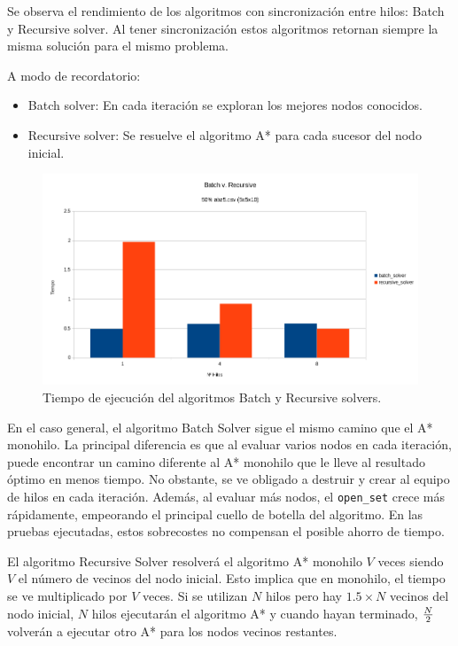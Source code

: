 Se observa el rendimiento de los algoritmos con sincronización entre hilos:
Batch y Recursive solver.
Al tener sincronización estos algoritmos retornan siempre la misma solución
para el mismo problema.

A modo de recordatorio:
\begin{itemize}[itemsep=0.25px]
    \item Batch solver: En cada iteración se exploran los mejores nodos conocidos.
    \item Recursive solver: Se resuelve el algoritmo A* para cada sucesor del nodo inicial.
\end{itemize}

\begin{figure}[h]
    \begin{center}
        \includegraphics[width=\textwidth]{Media/Ch2/Runtime_BatchRecursive.png}
    \end{center}
    \caption{Tiempo de ejecución del algoritmos Batch y Recursive solvers.}
    \label{fig:BatchRecursive}
\end{figure}

En el caso general, el algoritmo Batch Solver sigue el mismo camino que
el A* monohilo. La principal diferencia es que al evaluar varios nodos
en cada iteración, puede encontrar un camino diferente al A* monohilo
que le lleve al resultado óptimo en menos tiempo.
No obstante, se ve obligado a destruir y crear al equipo de hilos
en cada iteración.
Además, al evaluar más nodos, el \lstinline{open_set} crece
más rápidamente, empeorando el principal cuello de botella
del algoritmo.
En las pruebas ejecutadas, estos sobrecostes
no compensan el posible ahorro de tiempo.

El algoritmo Recursive Solver resolverá el algoritmo A* monohilo $V$ veces
siendo $V$ el número de vecinos del nodo inicial.
Esto implica que en monohilo, el tiempo se ve multiplicado por $V$ veces.
Si se utilizan $N$ hilos pero hay $1.5 \times N$ vecinos del nodo inicial,
$N$ hilos ejecutarán el algoritmo A* y cuando hayan terminado, $N \over 2$
volverán a ejecutar otro A* para los nodos vecinos restantes.

